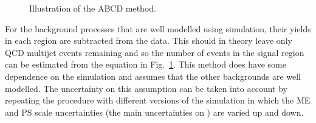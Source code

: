 \begin{figure}[ht!]
\begin{center}
\hspace{0.2cm}
\end{center}
\caption{Illustration of the ABCD method.}
\label{fig:ABCDdiagram}
\end{figure}

For the background processes that are well modelled using simulation, their yields in each region are subtracted from the data. This should in theory leave only QCD multijet events remaining and so the number of events in the signal region can be estimated from the equation in Fig.~\ref{fig:ABCDdiagram}. This method does have some dependence on the simulation and assumes that the other backgrounds are well modelled. The uncertainty on this assumption can be taken into account by repeating the procedure with different versions of the \ttbar simulation in which the ME and PS scale uncertainties (the main uncertainties on \ttbar) are varied up and down.


